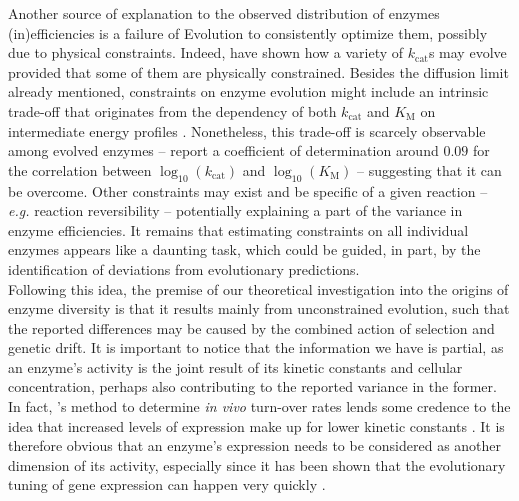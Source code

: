\documentclass[nogrid,crop,final]{MBE2}%
\begin{document}
Another source of explanation to the observed distribution of enzymes (in)efficiencies is a failure of Evolution to consistently optimize them, possibly due to physical constraints. Indeed, \citet{Heckmann18} have shown how a variety of $k_\text{cat}$s may evolve provided that some of them are physically constrained. Besides the diffusion limit already mentioned, constraints on enzyme evolution might include an intrinsic trade-off \citep{Gudelj10,Stiffler15} that originates from the dependency of both $k_\text{cat}$ and $K_\text{M}$ on intermediate energy profiles \citep{Heinrich91}. Nonetheless, this trade-off is scarcely observable among evolved enzymes -- \citet{Bar-Even11} report a coefficient of determination around $0.09$ for the correlation between $\log_{10}(k_\text{cat})$ and $\log_{10}(K_\text{M})$ -- suggesting that it can be overcome. 
Other constraints may exist and be specific of a given reaction \citep{Klipp94} -- \textit{e.g.} reaction reversibility -- potentially explaining a part of the variance in enzyme efficiencies.
It remains that estimating constraints on all individual enzymes appears like a daunting task, which could be guided, in part, by the identification of deviations from evolutionary predictions.\\


Following this idea, the premise of our theoretical investigation into the origins of enzyme diversity is that it results mainly from unconstrained evolution, such that the reported differences may be caused by the combined action of selection and genetic drift. It is important to notice that the information we have is partial, as an enzyme's activity is the joint result of its kinetic constants and cellular concentration, perhaps also contributing to the reported variance in the former. In fact, \citet{Davidi16}'s method to determine \textit{in vivo} turn-over rates lends some credence to the idea that increased levels of expression make up for lower kinetic constants \citep{Davidi18}. 
It is therefore obvious that an enzyme's expression needs to be considered as another dimension of its activity, especially since it has been shown that the evolutionary tuning of gene expression can happen very quickly \citep{Dekel05}.
\end{document}
